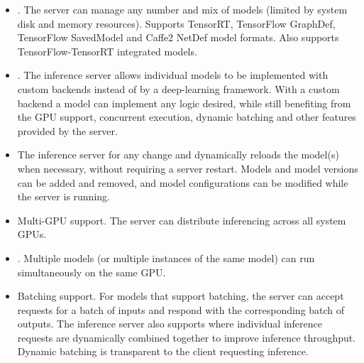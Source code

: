 \documentclass[letterpaper,10pt,english]{sphinxmanual}
\begin{document}
\begin{itemize}
\item {} 
. The
server can manage any number and mix of models (limited by system
disk and memory resources). Supports TensorRT, TensorFlow GraphDef,
TensorFlow SavedModel and Caffe2 NetDef model formats. Also supports
TensorFlow-TensorRT integrated models.

\item {} 
. The inference server
allows individual models to be implemented with custom backends
instead of by a deep-learning framework. With a custom backend a
model can implement any logic desired, while still benefiting from
the GPU support, concurrent execution, dynamic batching and other
features provided by the server.

\item {} 
The inference server 
for any change and dynamically reloads the model(s) when necessary,
without requiring a server restart. Models and model versions can be
added and removed, and model configurations can be modified while
the server is running.

\item {} 
Multi-GPU support. The server can distribute inferencing across all
system GPUs.

\item {} 
. Multiple
models (or multiple instances of the same model) can run
simultaneously on the same GPU.

\item {} 
Batching support. For models that support batching, the server can
accept requests for a batch of inputs and respond with the
corresponding batch of outputs. The inference server also supports
where individual inference requests are dynamically combined
together to improve inference throughput. Dynamic batching is
transparent to the client requesting inference.


\end{itemize}
\end{document}
